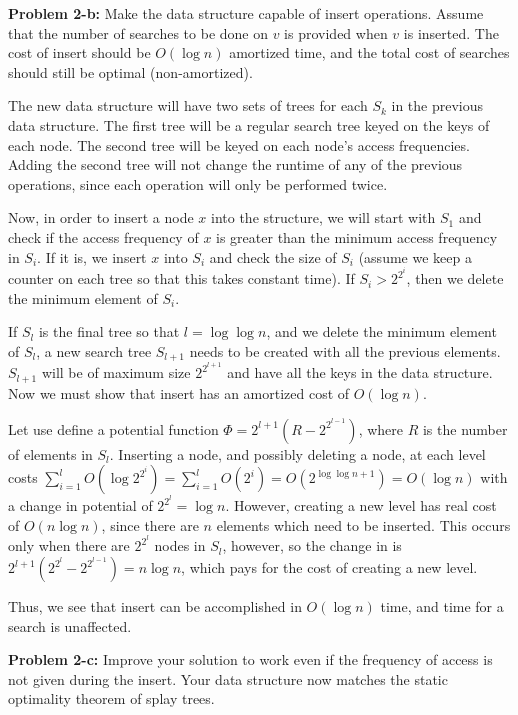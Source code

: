 \documentclass[psamsfonts]{amsart}
\newenvironment{sol}{\vspace{0.25cm}{\large \bfseries Solution:}}{\qedsymbol}
\newenvironment{prob}[1]{\begin{framed}{\large \bfseries Problem #1:}}{\end{framed}}
\begin{document}
\begin{prob}{2-b}
Make the data structure capable of insert operations. Assume that the number of searches to be done on $v$ is provided when $v$ is inserted. The cost of insert should be $O(\log n)$ amortized time, and the total cost of searches should still be optimal (non-amortized).
\end{prob}

\begin{sol}
The new data structure will have two sets of trees for each $S_k$ in the previous data structure. The first tree will be a regular search tree keyed on the keys of each node. The second tree will be keyed on each node's access frequencies. Adding the second tree will not change the runtime of any of the previous operations, since each operation will only be performed twice. 

Now, in order to insert a node $x$ into the structure, we will start with $S_1$ and check if the access frequency of $x$ is greater than the minimum access frequency in $S_i$. If it is, we insert $x$ into $S_i$ and check the size of $S_i$ (assume we keep a counter on each tree so that this takes constant time). If $S_i > 2^{2^i}$, then we delete the minimum element of $S_i$. 

If $S_l$ is the final tree so that $l = \log \log n$, and we delete the minimum element of $S_l$, a new search tree $S_{l+1}$ needs to be created with all the previous elements. $S_{l+1}$ will be of maximum size $2^{2^{l+1}}$ and have all the keys in the data structure. Now we must show that insert has an amortized cost of $O(\log n)$. 

Let use define a potential function $\Phi = 2^{l+1}(R - 2^{2^{l-1}})$, where $R$ is the number of elements in $S_l$. Inserting a node, and possibly deleting a node, at each level costs $\sum_{i=1}^l O(\log 2^{2^{i}}) = \sum_{i=1}^l O(2^i) = O(2^{\log \log n + 1}) = O(\log n)$ with a change in potential of $2^{2^{l}} = \log n$. However, creating a new level has real cost of $O(n \log n)$, since there are $n$ elements which need to be inserted. This occurs only when there are $2^{2^l}$ nodes in $S_l$, however, so the change in is $2^{l+1}(2^{2^l} - 2^{2^{l-1}}) = n \log n$, which pays for the cost of creating a new level.

Thus, we see that insert can be accomplished in $O(\log n)$ time, and time for a search is unaffected.
\end{sol}

\begin{prob}{2-c}
Improve your solution to work even if the frequency of access is not given during the insert. Your data structure now matches the static optimality theorem of splay trees.
\end{prob}
\end{document}
